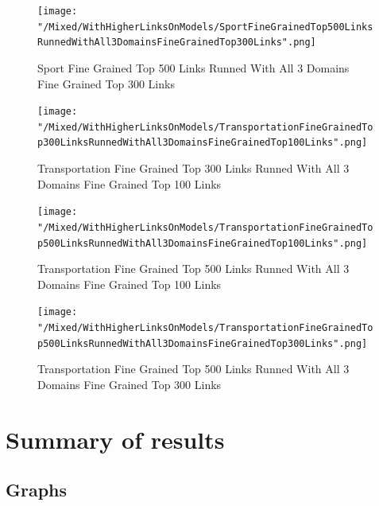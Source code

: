 \documentclass[thesis=M,english]{FITthesis}[2018/05/30]
\begin{document}
	\begin{figure}[H]\centering
		\texttt{[image: "/Mixed/WithHigherLinksOnModels/SportFineGrainedTop500LinksRunnedWithAll3DomainsFineGrainedTop300Links".png]}
		\caption{Sport Fine Grained Top 500 Links Runned With All 3 Domains Fine Grained Top 300 Links}\label{}
	\end{figure}


	\begin{figure}[H]\centering
		\texttt{[image: "/Mixed/WithHigherLinksOnModels/TransportationFineGrainedTop300LinksRunnedWithAll3DomainsFineGrainedTop100Links".png]}
		\caption{Transportation Fine Grained Top 300 Links Runned With All 3 Domains Fine Grained Top 100 Links}\label{}
	\end{figure}	

	\begin{figure}[H]\centering
		\texttt{[image: "/Mixed/WithHigherLinksOnModels/TransportationFineGrainedTop500LinksRunnedWithAll3DomainsFineGrainedTop100Links".png]}
		\caption{Transportation Fine Grained Top 500 Links Runned With All 3 Domains Fine Grained Top 100 Links}\label{}
	\end{figure}	

	\begin{figure}[H]\centering
		\texttt{[image: "/Mixed/WithHigherLinksOnModels/TransportationFineGrainedTop500LinksRunnedWithAll3DomainsFineGrainedTop300Links".png]}
		\caption{Transportation Fine Grained Top 500 Links Runned With All 3 Domains Fine Grained Top 300 Links}\label{}
	\end{figure}			
	
\section{Summary of results}
\subsection{Graphs}
%	
\end{document}
